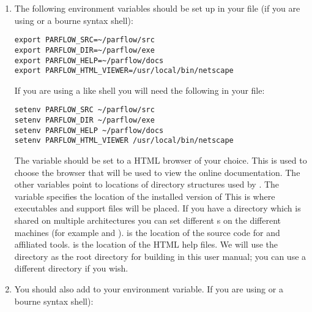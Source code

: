 \begin{enumerate}

\item
The following environment variables should be set up in your 
file (if you are using  or a bourne syntax shell):

\begin{display}\begin{verbatim}
export PARFLOW_SRC=~/parflow/src
export PARFLOW_DIR=~/parflow/exe
export PARFLOW_HELP=~/parflow/docs
export PARFLOW_HTML_VIEWER=/usr/local/bin/netscape

\end{verbatim}\end{display}

If you are using a  like shell you will need the following in your
 file:

\begin{display}\begin{verbatim}
setenv PARFLOW_SRC ~/parflow/src
setenv PARFLOW_DIR ~/parflow/exe
setenv PARFLOW_HELP ~/parflow/docs
setenv PARFLOW_HTML_VIEWER /usr/local/bin/netscape
\end{verbatim}\end{display}

The  variable should be set to a HTML
browser of your choice.  This is used to choose the browser that will
be used to view the online documentation.  The other variables point
to locations of directory structures used by \parflow{}.  The variable
 specifies the location of the installed version of
\parflow{}  This is where executables and support files will be placed.
If you have a directory which is shared on multiple architectures you
can set different s on the different machines (for
example
 and ).   is the location of the source code for \parflow{} and affiliated tools.  is the location of the HTML help files.
We will use the  directory as the root directory for
building \parflow{} in this user manual; you can use a different
directory if you wish.

\item

You should also add  to your 
 environment variable.  
If you are using  or a bourne syntax shell):


\end{enumerate}
